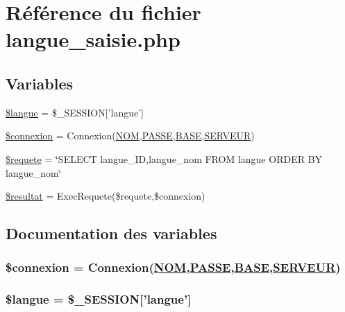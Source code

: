 \hypertarget{langue__saisie_8php}{
\section{R\'{e}f\'{e}rence du fichier langue\_\-saisie.php}
\label{langue__saisie_8php}
}
\subsection*{Variables}
\begin{CompactItemize}
\item 
\hyperlink{langue__saisie_8php_a0}{\$langue} = \$\_\-SESSION\mbox{[}'langue'\mbox{]}
\item 
\hyperlink{langue__saisie_8php_a1}{\$connexion} = Connexion(\hyperlink{pma__connect_8php_a0}{NOM},\hyperlink{pma__connect_8php_a1}{PASSE},\hyperlink{pma__connect_8php_a3}{BASE},\hyperlink{pma__connect_8php_a2}{SERVEUR})
\item 
\hyperlink{langue__saisie_8php_a2}{\$requete} = \char`\"{}SELECT langue\_\-ID,langue\_\-nom FROM langue ORDER BY langue\_\-nom\char`\"{}
\item 
\hyperlink{langue__saisie_8php_a3}{\$resultat} = Exec\-Requete(\$requete,\$connexion)
\end{CompactItemize}


\subsection{Documentation des variables}
\hypertarget{langue__saisie_8php_a1}{
\subsubsection[\$connexion]{\setlength{\rightskip}{0pt plus 5cm}\$connexion = Connexion(\hyperlink{pma__connect_8php_a0}{NOM},\hyperlink{pma__connect_8php_a1}{PASSE},\hyperlink{pma__connect_8php_a3}{BASE},\hyperlink{pma__connect_8php_a2}{SERVEUR})}}
\label{langue__saisie_8php_a1}


\hypertarget{langue__saisie_8php_a0}{
\subsubsection[\$langue]{\setlength{\rightskip}{0pt plus 5cm}\$langue = \$\_\-SESSION\mbox{[}'langue'\mbox{]}}}
\label{langue__saisie_8php_a0}


